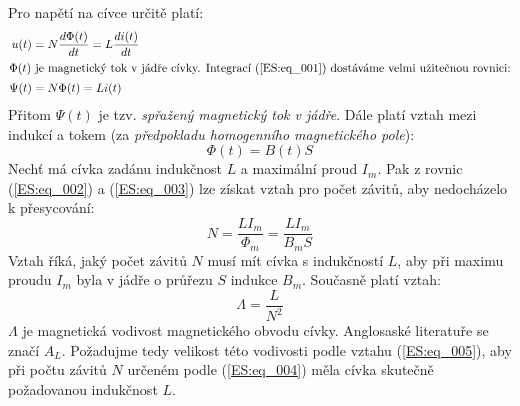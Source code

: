 {      Pro napětí na cívce určitě platí:
      \begin{align}
        u(t)    &= N\dfrac{d \Phi(t)}{d t} = L\dfrac{d i(t)}{d t}            \label{ES:eq_001}  \\
        \shortintertext{\(\Phi(t)\) je magnetický tok v jádře cívky. Integrací (\ref{ES:eq_001}) 
                       dostáváme velmi užitečnou rovnici:} 
        \Psi(t) &= N\Phi(t) = Li(t)                              \label{ES:eq_002}  
      \end{align}
      Přitom \(\Psi(t)\) je tzv. \emph{spřažený magnetický tok v jádře}. Dále platí vztah mezi 
      indukcí a tokem (za \emph{předpokladu homogenního magnetického pole}):
      \begin{equation}\label{ES:eq_003} 
        \Phi(t) = B(t)S
      \end{equation}
      Nechť má cívka zadánu indukčnost \(L\) a maximální proud \(I_m\). Pak z rovnic 
      (\ref{ES:eq_002}) a (\ref{ES:eq_003}) lze získat vztah pro počet závitů, aby nedocházelo k 
      přesycování:
      \begin{equation}\label{ES:eq_004}
        N = \frac{LI_m}{\Phi_m} = \frac{LI_m}{B_mS} 
      \end{equation}
      Vztah říká, jaký počet závitů \(N\) musí mít cívka s indukčností \(L\), aby při maximu proudu 
      \(I_m\) byla v jádře o průřezu \(S\) indukce \(B_m\). Současně platí vztah:
      \begin{equation}\label{ES:eq_005}
        \Lambda = \frac{L}{N^2} 
      \end{equation}
      \(\Lambda\) je magnetická vodivost magnetického obvodu cívky. Anglosaské literatuře se značí 
      \(A_L\). Požadujme tedy velikost této vodivosti podle vztahu (\ref{ES:eq_005}), aby při počtu 
      závitů \(N\) určeném podle (\ref{ES:eq_004}) měla cívka skutečně požadovanou indukčnost \(L\).
      
}
